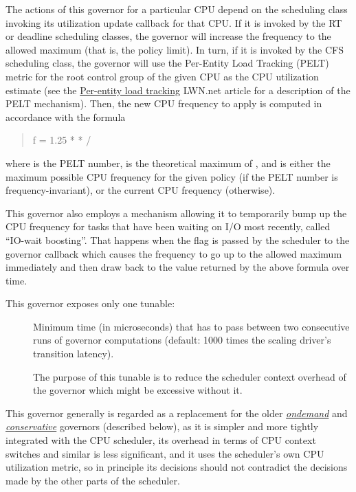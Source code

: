 \documentclass[a4paper,8pt,english]{sphinxmanual}
\begin{document}
The actions of this governor for a particular CPU depend on the scheduling class
invoking its utilization update callback for that CPU.  If it is invoked by the
RT or deadline scheduling classes, the governor will increase the frequency to
the allowed maximum (that is, the  policy limit).  In turn,
if it is invoked by the CFS scheduling class, the governor will use the
Per-Entity Load Tracking (PELT) metric for the root control group of the
given CPU as the CPU utilization estimate (see the \href{https://lwn.net/Articles/531853/}{Per-entity load tracking}
LWN.net article for a description of the PELT mechanism).  Then, the new
CPU frequency to apply is computed in accordance with the formula
\begin{quote}

f = 1.25 *  *  / 
\end{quote}

where  is the PELT number,  is the theoretical maximum of
, and  is either the maximum possible CPU frequency for the given
policy (if the PELT number is frequency-invariant), or the current CPU frequency
(otherwise).

This governor also employs a mechanism allowing it to temporarily bump up the
CPU frequency for tasks that have been waiting on I/O most recently, called
``IO-wait boosting''.  That happens when the  flag
is passed by the scheduler to the governor callback which causes the frequency
to go up to the allowed maximum immediately and then draw back to the value
returned by the above formula over time.

This governor exposes only one tunable:
\begin{description}
\item[{}] \leavevmode
Minimum time (in microseconds) that has to pass between two consecutive
runs of governor computations (default: 1000 times the scaling driver's
transition latency).

The purpose of this tunable is to reduce the scheduler context overhead
of the governor which might be excessive without it.

\end{description}

This governor generally is regarded as a replacement for the older {\hyperref[admin\string-guide/pm/cpufreq:ondemand]{\emph{ondemand}}}
and {\hyperref[admin\string-guide/pm/cpufreq:conservative]{\emph{conservative}}} governors (described below), as it is simpler and more
tightly integrated with the CPU scheduler, its overhead in terms of CPU context
switches and similar is less significant, and it uses the scheduler's own CPU
utilization metric, so in principle its decisions should not contradict the
decisions made by the other parts of the scheduler.
\end{document}
